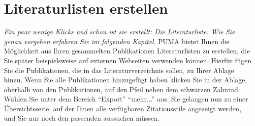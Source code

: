 \section{Literaturlisten erstellen}
\textit{Ein paar wenige Klicks und schon ist sie erstellt: Die Literaturliste. Wie Sie genau vorgehen erfahren Sie im folgenden Kapitel.}\newline
\newline
PUMA bietet Ihnen die Möglichkeit aus Ihren gesammelten Publikationen Literaturlisten zu erstellen, die Sie später beispielsweise auf externen Webseiten verwenden können. \newline
Hierfür fügen Sie die Publikationen, die in das Literaturverzeichnis sollen, zu Ihrer Ablage hinzu. Wenn Sie alle Publikationen hinzugefügt haben klicken Sie in der Ablage, oberhalb von den Publikationen, auf den Pfeil neben dem schwarzen Zahnrad. Wählen Sie unter dem Bereich \enquote{Export} \enquote{mehr...} aus. Sie gelangen nun zu einer Übersichtsseite, auf der Ihnen alle verfügbaren Zitationsstile angezeigt werden, und Sie nur noch den passenden aussuchen müssen. 
